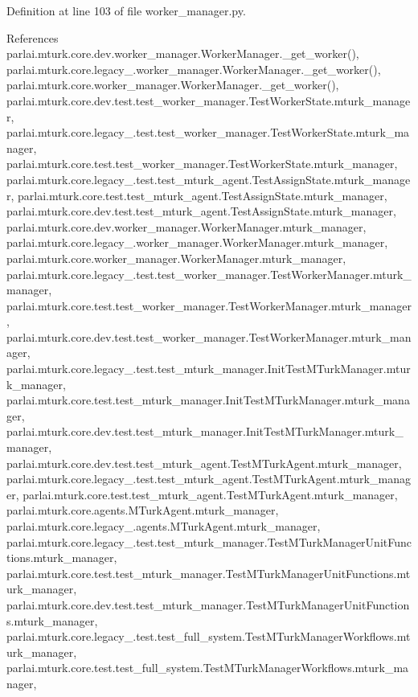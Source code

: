 Definition at line 103 of file worker\+\_\+manager.\+py.



References parlai.\+mturk.\+core.\+dev.\+worker\+\_\+manager.\+Worker\+Manager.\+\_\+get\+\_\+worker(), parlai.\+mturk.\+core.\+legacy\+\_.\+worker\+\_\+manager.\+Worker\+Manager.\+\_\+get\+\_\+worker(), parlai.\+mturk.\+core.\+worker\+\_\+manager.\+Worker\+Manager.\+\_\+get\+\_\+worker(), parlai.\+mturk.\+core.\+dev.\+test.\+test\+\_\+worker\+\_\+manager.\+Test\+Worker\+State.\+mturk\+\_\+manager, parlai.\+mturk.\+core.\+legacy\+\_.\+test.\+test\+\_\+worker\+\_\+manager.\+Test\+Worker\+State.\+mturk\+\_\+manager, parlai.\+mturk.\+core.\+test.\+test\+\_\+worker\+\_\+manager.\+Test\+Worker\+State.\+mturk\+\_\+manager, parlai.\+mturk.\+core.\+legacy\+\_.\+test.\+test\+\_\+mturk\+\_\+agent.\+Test\+Assign\+State.\+mturk\+\_\+manager, parlai.\+mturk.\+core.\+test.\+test\+\_\+mturk\+\_\+agent.\+Test\+Assign\+State.\+mturk\+\_\+manager, parlai.\+mturk.\+core.\+dev.\+test.\+test\+\_\+mturk\+\_\+agent.\+Test\+Assign\+State.\+mturk\+\_\+manager, parlai.\+mturk.\+core.\+dev.\+worker\+\_\+manager.\+Worker\+Manager.\+mturk\+\_\+manager, parlai.\+mturk.\+core.\+legacy\+\_.\+worker\+\_\+manager.\+Worker\+Manager.\+mturk\+\_\+manager, parlai.\+mturk.\+core.\+worker\+\_\+manager.\+Worker\+Manager.\+mturk\+\_\+manager, parlai.\+mturk.\+core.\+legacy\+\_.\+test.\+test\+\_\+worker\+\_\+manager.\+Test\+Worker\+Manager.\+mturk\+\_\+manager, parlai.\+mturk.\+core.\+test.\+test\+\_\+worker\+\_\+manager.\+Test\+Worker\+Manager.\+mturk\+\_\+manager, parlai.\+mturk.\+core.\+dev.\+test.\+test\+\_\+worker\+\_\+manager.\+Test\+Worker\+Manager.\+mturk\+\_\+manager, parlai.\+mturk.\+core.\+legacy\+\_.\+test.\+test\+\_\+mturk\+\_\+manager.\+Init\+Test\+M\+Turk\+Manager.\+mturk\+\_\+manager, parlai.\+mturk.\+core.\+test.\+test\+\_\+mturk\+\_\+manager.\+Init\+Test\+M\+Turk\+Manager.\+mturk\+\_\+manager, parlai.\+mturk.\+core.\+dev.\+test.\+test\+\_\+mturk\+\_\+manager.\+Init\+Test\+M\+Turk\+Manager.\+mturk\+\_\+manager, parlai.\+mturk.\+core.\+dev.\+test.\+test\+\_\+mturk\+\_\+agent.\+Test\+M\+Turk\+Agent.\+mturk\+\_\+manager, parlai.\+mturk.\+core.\+legacy\+\_.\+test.\+test\+\_\+mturk\+\_\+agent.\+Test\+M\+Turk\+Agent.\+mturk\+\_\+manager, parlai.\+mturk.\+core.\+test.\+test\+\_\+mturk\+\_\+agent.\+Test\+M\+Turk\+Agent.\+mturk\+\_\+manager, parlai.\+mturk.\+core.\+agents.\+M\+Turk\+Agent.\+mturk\+\_\+manager, parlai.\+mturk.\+core.\+legacy\+\_.\+agents.\+M\+Turk\+Agent.\+mturk\+\_\+manager, parlai.\+mturk.\+core.\+legacy\+\_.\+test.\+test\+\_\+mturk\+\_\+manager.\+Test\+M\+Turk\+Manager\+Unit\+Functions.\+mturk\+\_\+manager, parlai.\+mturk.\+core.\+test.\+test\+\_\+mturk\+\_\+manager.\+Test\+M\+Turk\+Manager\+Unit\+Functions.\+mturk\+\_\+manager, parlai.\+mturk.\+core.\+dev.\+test.\+test\+\_\+mturk\+\_\+manager.\+Test\+M\+Turk\+Manager\+Unit\+Functions.\+mturk\+\_\+manager, parlai.\+mturk.\+core.\+legacy\+\_.\+test.\+test\+\_\+full\+\_\+system.\+Test\+M\+Turk\+Manager\+Workflows.\+mturk\+\_\+manager, parlai.\+mturk.\+core.\+test.\+test\+\_\+full\+\_\+system.\+Test\+M\+Turk\+Manager\+Workflows.\+mturk\+\_\+manager, 